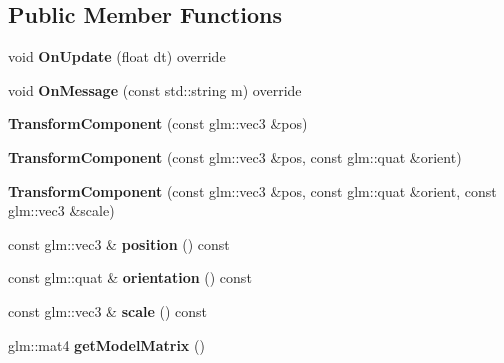 \subsection*{Public Member Functions}
\begin{DoxyCompactItemize}
\item 
\mbox{\label{class_transform_component_ab763f5af77fcb5eee0e725c219901fa3}} 
void {\bfseries On\+Update} (float dt) override
\item 
\mbox{\label{class_transform_component_ac250c4b7e47e639d0f8693d04c9b5051}} 
void {\bfseries On\+Message} (const std\+::string m) override
\item 
\mbox{\label{class_transform_component_a01037615eda19c3bbb51c99094839574}} 
{\bfseries Transform\+Component} (const glm\+::vec3 \&pos)
\item 
\mbox{\label{class_transform_component_a05ce9d2b5a350a5d8d67ce6b323818d4}} 
{\bfseries Transform\+Component} (const glm\+::vec3 \&pos, const glm\+::quat \&orient)
\item 
\mbox{\label{class_transform_component_aa823162adc73870484409dcdb8cc95f3}} 
{\bfseries Transform\+Component} (const glm\+::vec3 \&pos, const glm\+::quat \&orient, const glm\+::vec3 \&scale)
\item 
\mbox{\label{class_transform_component_a1f236ca0fb57ccb2a5e1238502a880ac}} 
const glm\+::vec3 \& {\bfseries position} () const
\item 
\mbox{\label{class_transform_component_a7655d65aee0cb5dc459e8f632c80a6d1}} 
const glm\+::quat \& {\bfseries orientation} () const
\item 
\mbox{\label{class_transform_component_a4b04c6a025c6be6bd0b9400827ee2291}} 
const glm\+::vec3 \& {\bfseries scale} () const
\item 
\mbox{\label{class_transform_component_a5fc531fdaba497dfb2013edce34cb094}} 
glm\+::mat4 {\bfseries get\+Model\+Matrix} ()
\item 

\end{DoxyCompactItemize}
